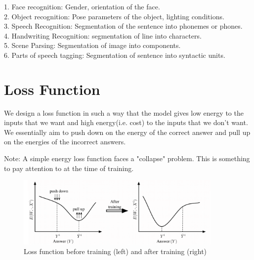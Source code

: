 1. Face recognition: Gender, orientation of the face. \\
2. Object recognition: Pose parameters of the object, lighting conditions.\\
3. Speech Recognition: Segmentation of the sentence into phonemes or phones.\\
4. Handwriting Recognition: segmentation of line into characters.\\
5. Scene Parsing: Segmentation of image into components.\\
6. Parts of speech tagging: Segmentation of sentence into syntactic units.\\

\section{Loss Function}

We design a loss function in such a way that the model gives low energy to the inputs that we want and high energy(i.e. cost) to the inputs that we don’t want. We essentially aim to push down on the energy of the correct answer and pull up on the energies of the incorrect answers.

Note: A simple energy loss function faces a "collapse" problem. This is something to pay attention to at the time of training.

\begin{figure}[t]
\centering
\includegraphics[width=100mm]{figs/4.png}
\caption{Loss function before training (left) and after training (right)}
\end{figure}

